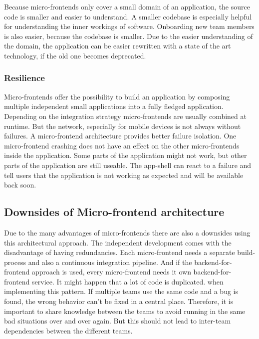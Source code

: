 Because micro-frontends only cover a small domain of an application, the source code is smaller and easier to understand. A smaller codebase is especially helpful for understanding the inner workings of software. Onboarding new team members is also easier, because the codebase is smaller.
Due to the easier understanding of the domain, the application can be easier rewritten with a state of the art technology, if the old one becomes deprecated. \cite{book:2020:geers:background:micro-frontends:micro-frontends-in-action}

\subsubsection{Resilience}

Micro-frontends offer the possibility to build an application by composing multiple independent small applications into a fully fledged application. Depending on the integration strategy micro-frontends are usually combined at runtime. But the network, especially for mobile devices is not always without failures. A micro-frontend architecture provides better failure isolation. One micro-frontend crashing does not have an effect on the other micro-frontends inside the application. Some parts of the application might not work, but other parts of the application are still useable. The app-shell can react to a failure and tell users that the application is not working as expected and will be available back soon. \cite[10-11]{article:2021:perltonen:background:micro-frontends:motivations-benefits-and-issues}

\subsection{Downsides of Micro-frontend architecture}

Due to the many advantages of micro-frontends there are also a downsides using this architectural approach. The independent development comes with the disadvantage of having redundancies. Each micro-frontend needs a separate build-process and also a continuous integration pipeline. And if the backend-for-frontend approach is used, every micro-frontend needs it own backend-for-frontend service. It might happen that a lot of code is duplicated. when implementing this pattern. If multiple teams use the same code and a bug is found, the wrong behavior can't be fixed in a central place. Therefore, it is important to share knowledge between the teams to avoid running in the same bad situations over and over again. But this should not lead to inter-team dependencies between the different teams.
\cite[17-18]{book:2020:geers:background:micro-frontends:micro-frontends-in-action}









